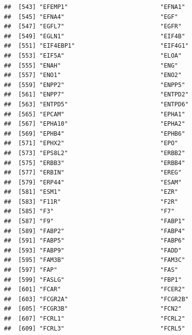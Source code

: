 \documentclass[
]{article}
\begin{document}
\begin{verbatim}
##  [543] "EFEMP1"                          "EFNA1"                          
##  [545] "EFNA4"                           "EGF"                            
##  [547] "EGFL7"                           "EGFR"                           
##  [549] "EGLN1"                           "EIF4B"                          
##  [551] "EIF4EBP1"                        "EIF4G1"                         
##  [553] "EIF5A"                           "ELOA"                           
##  [555] "ENAH"                            "ENG"                            
##  [557] "ENO1"                            "ENO2"                           
##  [559] "ENPP2"                           "ENPP5"                          
##  [561] "ENPP7"                           "ENTPD2"                         
##  [563] "ENTPD5"                          "ENTPD6"                         
##  [565] "EPCAM"                           "EPHA1"                          
##  [567] "EPHA10"                          "EPHA2"                          
##  [569] "EPHB4"                           "EPHB6"                          
##  [571] "EPHX2"                           "EPO"                            
##  [573] "EPS8L2"                          "ERBB2"                          
##  [575] "ERBB3"                           "ERBB4"                          
##  [577] "ERBIN"                           "EREG"                           
##  [579] "ERP44"                           "ESAM"                           
##  [581] "ESM1"                            "EZR"                            
##  [583] "F11R"                            "F2R"                            
##  [585] "F3"                              "F7"                             
##  [587] "F9"                              "FABP1"                          
##  [589] "FABP2"                           "FABP4"                          
##  [591] "FABP5"                           "FABP6"                          
##  [593] "FABP9"                           "FADD"                           
##  [595] "FAM3B"                           "FAM3C"                          
##  [597] "FAP"                             "FAS"                            
##  [599] "FASLG"                           "FBP1"                           
##  [601] "FCAR"                            "FCER2"                          
##  [603] "FCGR2A"                          "FCGR2B"                         
##  [605] "FCGR3B"                          "FCN2"                           
##  [607] "FCRL1"                           "FCRL2"                          
##  [609] "FCRL3"                           "FCRL5"                          

\end{verbatim}
\end{document}
